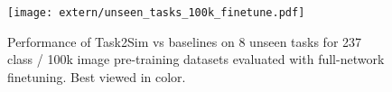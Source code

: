 \begin{figure}[h]
    \centering
    \texttt{[image: extern/unseen\_tasks\_100k\_finetune.pdf]}
    \vspace{-2mm}
    \caption{Performance of Task2Sim vs baselines on 8 unseen tasks for 237 class / 100k image pre-training datasets evaluated with full-network finetuning. Best viewed in color.}
    \label{fig:main_all_unseen}
    \vspace{-3mm}
\end{figure}